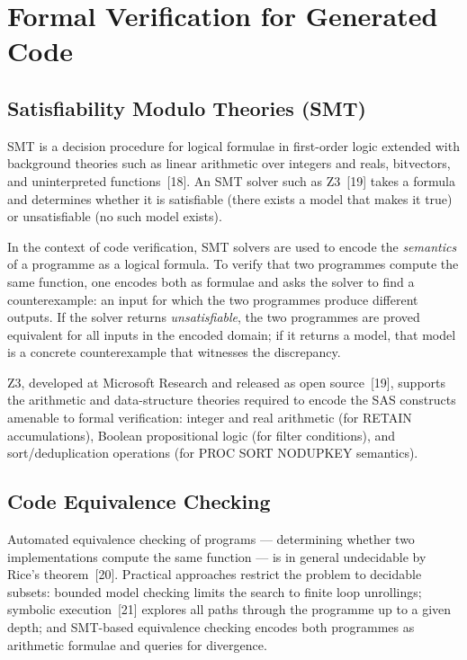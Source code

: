 \section{Formal Verification for Generated Code}
\label{sec:formal-verification-theory}

\subsection{Satisfiability Modulo Theories (SMT)}
\label{subsec:smt-theory}

\ac{SMT} is a decision procedure for logical formulae in first-order logic
extended with background theories such as linear arithmetic over integers and
reals, bitvectors, and uninterpreted functions~[18]. An \ac{SMT} solver such
as Z3~[19] takes a formula and determines whether it is satisfiable (there
exists a model that makes it true) or unsatisfiable (no such model exists).

In the context of code verification, \ac{SMT} solvers are used to encode the
\emph{semantics} of a programme as a logical formula. To verify that two
programmes compute the same function, one encodes both as formulae and asks the
solver to find a counterexample: an input for which the two programmes produce
different outputs. If the solver returns \emph{unsatisfiable}, the two
programmes are proved equivalent for all inputs in the encoded domain; if it
returns a model, that model is a concrete counterexample that witnesses the
discrepancy.

Z3, developed at Microsoft Research and released as open source~[19], supports
the arithmetic and data-structure theories required to encode the SAS constructs
amenable to formal verification: integer and real arithmetic (for RETAIN
accumulations), Boolean propositional logic (for filter conditions), and
sort/deduplication operations (for PROC SORT NODUPKEY semantics).

\subsection{Code Equivalence Checking}
\label{subsec:equivalence-checking}

Automated equivalence checking of programs --- determining whether two
implementations compute the same function --- is in general undecidable by
Rice's theorem~[20]. Practical approaches restrict the problem to decidable
subsets: bounded model checking limits the search to finite loop unrollings;
symbolic execution~[21] explores all paths through the programme up to a given
depth; and \ac{SMT}-based equivalence checking encodes both programmes as
arithmetic formulae and queries for divergence.

